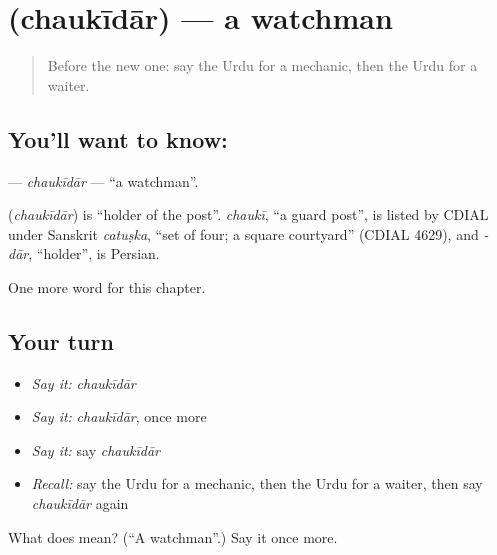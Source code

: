 \section[\texorpdfstring{\ur{چوکیدار} (chaukīdār)}{چوکیدار (chaukīdār)}]{ (chaukīdār) — a watchman}

\label{lesson:UR-C237-chaukidar}



\begin{quote}
Before the new one: say the Urdu for a mechanic, then the Urdu for a waiter.
\end{quote}

\subsection*{You'll want to know: }
\textbf{} — \emph{chaukīdār} — \textquotedblleft{}a watchman\textquotedblright{}.

\begin{cousinweb}
\textbf{} (\emph{chaukīdār}) is \textquotedblleft{}holder of the post\textquotedblright{}. \emph{chaukī}, \textquotedblleft{}a guard post\textquotedblright{}, is listed by CDIAL under Sanskrit \emph{catuṣka}, \textquotedblleft{}set of four; a square courtyard\textquotedblright{} (CDIAL 4629), and \emph{-dār}, \textquotedblleft{}holder\textquotedblright{}, is Persian.
\end{cousinweb}

\begin{grammarlens}[title={What you've built}]
One more word for this chapter.
\end{grammarlens}

\subsection*{Your turn}
\begin{itemize}
\raggedright
  \item \emph{Say it:} \emph{chaukīdār}
  \item \emph{Say it:} \emph{chaukīdār}, once more
  \item \emph{Say it:} say \emph{chaukīdār}
  \item \emph{Recall:} say the Urdu for a mechanic, then the Urdu for a waiter, then say \emph{chaukīdār} again
\end{itemize}

\begin{tcolorbox}[breakable,colback=teal!4,colframe=teal!35!black,title={Before you move on}]
What does  mean? (\textquotedblleft{}A watchman\textquotedblright{}.) Say it once more.
\end{tcolorbox}
